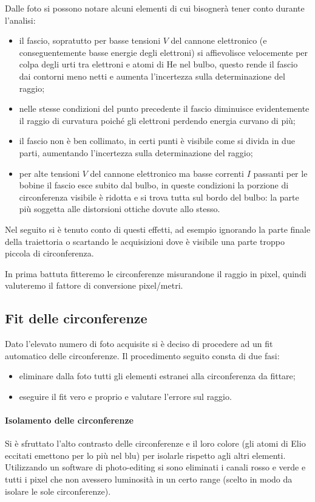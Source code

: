 Dalle foto si possono notare alcuni elementi di cui bisognerà tener conto durante l'analisi:
\begin{itemize}
	\item il fascio, sopratutto per basse tensioni $V$ del cannone elettronico (e conseguentemente basse energie degli elettroni) si affievolisce velocemente per colpa degli urti tra elettroni e atomi di He nel bulbo, questo rende il fascio dai contorni meno netti e aumenta l'incertezza sulla determinazione del raggio;
	\item nelle stesse condizioni del punto precedente il fascio diminuisce evidentemente il raggio di curvatura poiché gli elettroni perdendo energia curvano di più;
	\item il fascio non è ben collimato, in certi punti è visibile come si divida in due parti, aumentando l'incertezza sulla determinazione del raggio;
	\item per alte tensioni $V$ del cannone elettronico ma basse correnti $I$ passanti per le bobine il fascio esce subito dal bulbo, in queste condizioni la porzione di circonferenza visibile è ridotta e si trova tutta sul bordo del bulbo: la parte più soggetta alle distorsioni ottiche dovute allo stesso.
\end{itemize}

Nel seguito si è tenuto conto di questi effetti, ad esempio ignorando la parte finale della traiettoria o scartando le acquisizioni dove è visibile una parte troppo piccola di circonferenza.

In prima battuta fitteremo le circonferenze misurandone il raggio in pixel, quindi valuteremo il fattore di conversione pixel/metri.

\subsection{Fit delle circonferenze} 
Dato l'elevato numero di foto acquisite si è deciso di procedere ad un fit automatico delle circonferenze. Il procedimento seguito consta di due fasi:
\begin{itemize}
	\item eliminare dalla foto tutti gli elementi estranei alla circonferenza da fittare;
	\item eseguire il fit vero e proprio e valutare l'errore sul raggio.
\end{itemize}

\paragraph{Isolamento delle circonferenze} Si è sfruttato l'alto contrasto delle circonferenze e il loro colore (gli atomi di Elio eccitati emettono per lo più nel blu) per isolarle rispetto agli altri elementi. Utilizzando un software di photo-editing si sono eliminati i canali rosso e verde e tutti i pixel che non avessero luminosità in un certo range (scelto in modo da isolare le sole circonferenze). 

